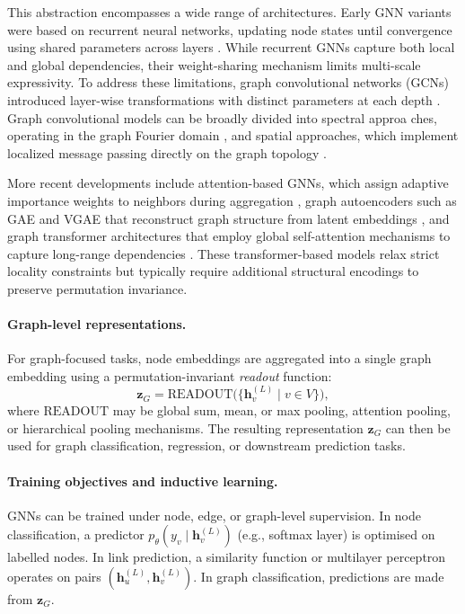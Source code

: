 This abstraction encompasses a wide range of architectures. Early GNN variants were based on recurrent neural networks, updating node states until convergence using shared parameters across layers \citep{li2016ggnn,selsam2019sat,tonshoff2023csp}. While recurrent GNNs capture both local and global dependencies, their weight-sharing mechanism limits multi-scale expressivity. To address these limitations, graph convolutional networks (GCNs) introduced layer-wise transformations with distinct parameters at each depth \citep{kipf2017semi}. Graph convolutional models can be broadly divided into spectral approa
ches, operating in the graph Fourier domain \citep{bruna2014spectral,defferrard2016cnn}, and spatial approaches, which implement localized message passing directly on the graph topology \citep{hamilton2017graphsage,velivckovic2018gat,xu2019powerful}.

More recent developments include attention-based GNNs, which assign adaptive importance weights to neighbors during aggregation \citep{velivckovic2018gat}, graph autoencoders such as GAE and VGAE that reconstruct graph structure from latent embeddings \citep{kipf2016vgae}, and graph transformer architectures that employ global self-attention mechanisms to capture long-range dependencies \citep{dwivedi2021graph,ying2021transformers,kreuzer2021rethinking,rampavsek2022recipe}. These transformer-based models relax strict locality constraints but typically require additional structural encodings to preserve permutation invariance.

\paragraph{Graph-level representations.}
For graph-focused tasks, node embeddings are aggregated into a single graph embedding using a permutation-invariant \emph{readout} function:
\[
\mathbf{z}_G
=
\mathrm{READOUT}\Big(\big\{\mathbf{h}_v^{(L)} \mid v\in V\big\}\Big),
\]
where $\mathrm{READOUT}$ may be global sum, mean, or max pooling, attention pooling, or hierarchical pooling mechanisms. The resulting representation $\mathbf{z}_G$ can then be used for graph classification, regression, or downstream prediction tasks.

\paragraph{Training objectives and inductive learning.}
GNNs can be trained under node, edge, or graph-level supervision. In node classification, a predictor $p_\theta(y_v \mid \mathbf{h}_v^{(L)})$ (e.g., softmax layer) is optimised on labelled nodes. In link prediction, a similarity function or multilayer perceptron operates on pairs $(\mathbf{h}_u^{(L)},\mathbf{h}_v^{(L)})$. In graph classification, predictions are made from $\mathbf{z}_G$.

